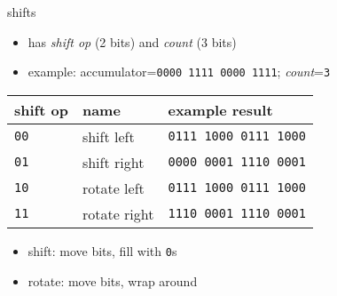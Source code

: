 \begin{frame}{shifts}
    \begin{itemize}
        \item has \textit{shift op} (2 bits) and \textit{count} (3 bits)
        \item example: accumulator={\tt \textcolor{s1}{0000} \textcolor{s2}{1111} \textcolor{s3}{0000} \textcolor{s4}{1111}}; \textit{count}={\tt 3}
    \end{itemize}
\begin{tabular}{l|l|l}
shift op & name & example result \\ \hline
\tt 00 & shift left & {\tt \textcolor{s1}{0}\textcolor{s2}{111 1}\textcolor{s3}{000 0}\textcolor{s4}{111 1}\textcolor{s0}{000}} \\
\tt 01 & shift right& {\tt \textcolor{s0}{000}\textcolor{s1}{0 000}\textcolor{s2}{1 111}\textcolor{s3}{0 000}\textcolor{s4}{1}} \\
\tt 10 & rotate left & {\tt \textcolor{s1}{0}\textcolor{s2}{111 1}\textcolor{s3}{000 0}\textcolor{s4}{111 1}\textcolor{s1}{000}} \\
\tt 11 & rotate right& {\tt \textcolor{s4}{111}\textcolor{s1}{0 000}\textcolor{s2}{1 111}\textcolor{s3}{0 000}\textcolor{s4}{1}} \\
\end{tabular}
    \begin{itemize}
    \item shift: move bits, fill with {\tt 0}s
    \item rotate: move bits, wrap around
    \end{itemize}
\end{frame}

